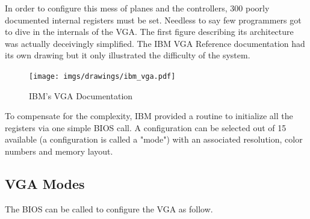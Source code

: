 \documentclass[book.tex]{subfiles}
\begin{document}
 

\par
In order to configure this mess of planes and the controllers, 300 poorly documented internal registers must be set. Needless to say few programmers got to dive in the internals of the VGA. The first figure describing its architecture was actually deceivingly simplified. The IBM VGA Reference documentation had its own drawing but it only illustrated the difficulty of the system.\\
 \begin{figure}[H]
\centering
\texttt{[image: imgs/drawings/ibm\_vga.pdf]}
\caption{IBM's VGA Documentation}
\label{fig:ibm_vga}
\end{figure}

\bigskip



To compensate for the complexity, IBM provided a routine to initialize all the registers via one simple BIOS call. A configuration can be selected out of 15 available (a configuration is called a "mode") with an associated resolution, color numbers and memory layout.

\subsection{VGA Modes}

The BIOS can be called to configure the VGA as follow.
\end{document}
